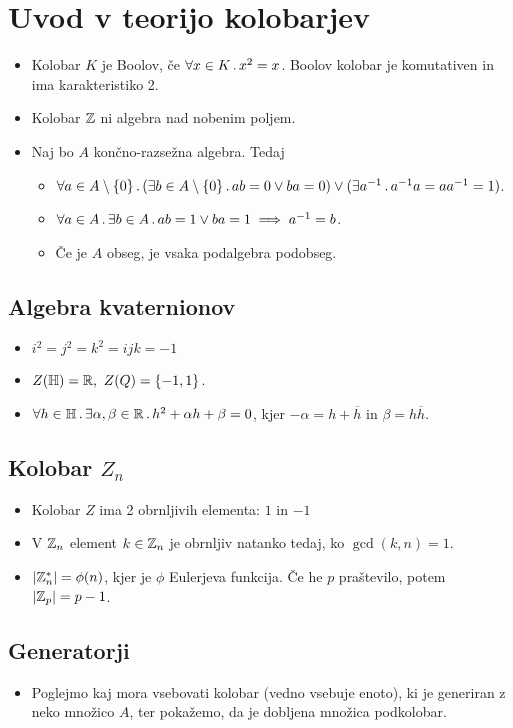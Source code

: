 \section{Uvod v teorijo kolobarjev}
\begin{itemize}
    \item Kolobar \(K\) je Boolov, če \(\forall x \in K \,.\,x^2 = x\). Boolov kolobar je komutativen in ima karakteristiko 2. 
    \item Kolobar \(\mathbb{Z}\) ni algebra nad nobenim poljem.
    \item Naj bo \(A\) končno-razsežna algebra. Tedaj 
    \begin{itemize}
        \item \(\forall a \in A \setminus \{0\} \,.\, (\exists b \in A \setminus \{0\} \,.\, a b = 0 \lor ba = 0) \lor (\exists a^{-1} \,.\, a^{-1}a=aa^{-1} = 1)\).
        \item \(\forall a \in A \,.\, \exists b \in A \,.\, ab = 1 \lor ba = 1 \implies a^{-1} = b\).
        \item Če je \(A\) obseg, je vsaka podalgebra podobseg.
    \end{itemize}
\end{itemize}

\subsection{Algebra kvaternionov}
\begin{itemize}
    \item \(i^2=j^2=k^2=ijk=-1\)
    \item \(Z(\mathbb{H}) = \mathbb{R}, \ Z(Q) = \{-1, 1\}\).
    \item \(\forall h \in \mathbb{H} \,.\, \exists \alpha, \beta \in \mathbb{R} \,.\, h^2 + \alpha h + \beta = 0\), kjer \(-\alpha = h + \overline{h}\) in \(\beta = h \overline{h}\).
\end{itemize}

\subsection{Kolobar \(Z_n\)}
\begin{itemize}
    \item Kolobar \(Z\) ima 2 obrnljivih elementa: \(1\) in \(-1\)
    \item V \(\mathbb{Z}_n\) element \(k \in \mathbb{Z}_n\) je obrnljiv natanko tedaj, ko \(\gcd (k, n) = 1\).
    \item \(|\mathbb{Z}_n^*| = \phi(n)\), kjer je \(\phi\) Eulerjeva funkcija. Če he \(p\) praštevilo, potem \(|\mathbb{Z}_p| = p - 1\).
\end{itemize}

\subsection{Generatorji}
\begin{itemize}
    \item Poglejmo kaj mora vsebovati kolobar (vedno vsebuje enoto), ki je generiran z neko množico \(A\), ter pokažemo, da je dobljena množica podkolobar.
\end{itemize}